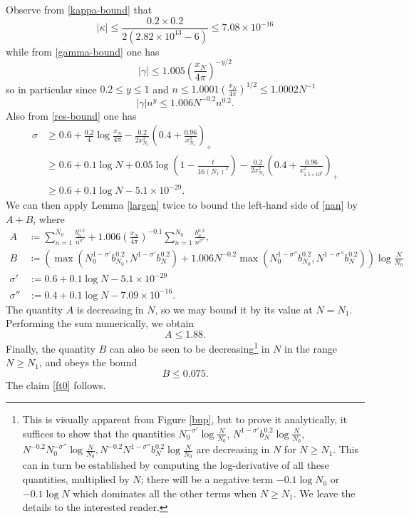 \documentclass[a4paper,11pt,twoside]{amsart}
\begin{document}
Observe from \eqref{kappa-bound} that
$$ |\kappa| \leq \frac{0.2 \times 0.2}{2(2.82 \times 10^{13}-6)} \leq 7.08 \times 10^{-16}$$
while from \eqref{gamma-bound} one has
$$
|\gamma| \leq 1.005 \left( \frac{x_N}{4\pi} \right)^{-y/2}$$
so in particular since $0.2 \leq y \leq 1$ and $n \leq 1.0001 (\frac{x_N}{4\pi})^{1/2} \leq 1.0002 N^{-1}$
$$
|\gamma| n^y \leq 1.006 N^{-0.2} n^{0.2}.$$
Also from \eqref{res-bound} one has
\begin{align*}
\sigma &\geq 0.6 + \frac{0.2}{4} \log \frac{x_N}{4\pi} - \frac{0.2}{2x_{N_1}^2} \left(0.4+\frac{0.96}{x_{N_1}^2}\right)_+ \\
&\geq 0.6 + 0.1 \log N + 0.05 \log \left(1 - \frac{t}{16 (N_1)^2}\right) - \frac{0.2}{2x_{N_1}^2} \left(0.4+\frac{0.96}{x_{1.5\times 10^6}^2}\right)_+ \\
&\geq 0.6 + 0.1 \log N - 5.1 \times 10^{-29}.
\end{align*}
We can then apply Lemma \ref{largen} twice to bound the left-hand side of \eqref{nan} by $A+B$, where
\begin{align*}
A &\coloneqq \sum_{n=1}^{N_0} \frac{b_n^{0.2}}{n^{\sigma'}} + 1.006 \left( \frac{x_N}{4\pi} \right)^{-0.1} \sum_{n=1}^{N_0} \frac{b_n^{0.2}}{n^{\sigma''}}, \\
B &\coloneqq (\max( N_0^{1-\sigma'} b_{N_0}^{0.2}, N^{1-\sigma'} b_N^{0.2} ) + 1.006 N^{-0.2} 
\max( N_0^{1-\sigma''} b_{N_0}^{0.2}, N^{1-\sigma''} b_N^{0.2} ) )\log \frac{N}{N_0} \\
\sigma' &:= 0.6 + 0.1 \log N - 5.1 \times 10^{-29} \\
\sigma'' &:= 0.4 + 0.1 \log N - 7.09 \times 10^{-16}.
\end{align*}
The quantity $A$ is decreasing in $N$, so we may bound it by its value at $N = N_1$.  Performing the sum numerically, we obtain
$$ A \leq 1.88.$$
Finally, the quantity $B$ can also be seen to be decreasing\footnote{This is visually apparent from Figure \ref{bnp}, but to prove it analytically, it suffices to show that the quantities $N_0^{-\sigma'} \log \frac{N}{N_0}$, $N^{1-\sigma'} b_N^{0.2} \log \frac{N}{N_0}$, $N^{-0.2} N_0^{-\sigma''} \log \frac{N}{N_0}, N^{-0.2} N^{1-\sigma''} b_N^{0.2} \log \frac{N}{N_0}$ are decreasing in $N$ for $N \geq N_1$.  This can in turn be established by computing the log-derivative of all these quantities, multiplied by $N$; there will be a negative term $-0.1 \log N_0$ or $-0.1 \log N$ which dominates all the other terms when $N \geq N_1$.  We leave the details to the interested reader.}  in $N$ in the range $N \geq N_1$, and obeys the bound
$$ B \leq 0.075.$$
The claim \eqref{ft0} follows.
\end{document}
